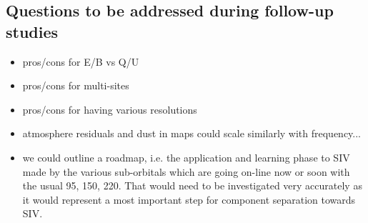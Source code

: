 \subsection{Questions to be addressed during follow-up studies}
\begin{itemize}
	\item pros/cons for E/B vs Q/U
	\item pros/cons for multi-sites
	\item pros/cons for having various resolutions
	\item atmosphere residuals and dust in maps could scale similarly with frequency...
	\item we could outline a roadmap, i.e. the application and learning phase to SIV made by the various sub-orbitals which are going on-line now or soon with the usual 95, 150, 220. That would need to be investigated very accurately as it would represent a most important step for component separation
towards SIV.
\end{itemize}





%



